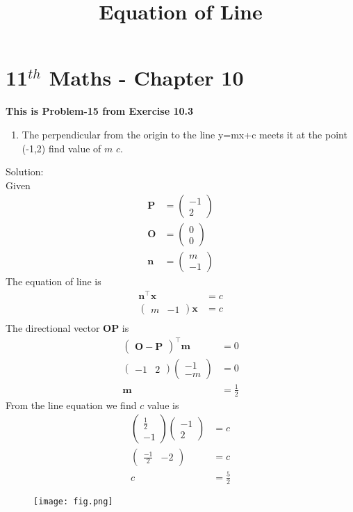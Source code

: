 \documentclass[journel,12pt,twocolumn]{article}
\newcommand{\myvec}[1]{\ensuremath{\begin{pmatrix}#1\end{pmatrix}}}
\let\vec\mathbf
\begin{document}
\begin{center}
\title{\textbf{Equation of Line}}
\date{\vspace{-5ex}} %
\maketitle
\end{center}
\section{11$^{th}$ Maths - Chapter 10}
\textbf{This is Problem-15 from Exercise 10.3}
\begin{enumerate}
\item The perpendicular from the origin to the line y=mx+c meets it at the point (-1,2) find value of $m$ $c$.
\end{enumerate}
Solution:
\\
Given
\begin{align}
\vec{P}&=\myvec{-1\\2}\\
\vec{O}&=\myvec{0\\0}\\
\vec{n}&=\myvec{m\\-1}
\end{align}
The equation of line is
\begin{align}
\vec{n}^{\top}\vec{x}&=c\\
\myvec{m&-1}\vec{x}&=c\\
\end{align}
The directional vector $\vec{OP}$ is 
\begin{align}
\myvec{\vec{O}-\vec{P}}^{\top}\vec{m}&=0\\
\myvec{-1&2}\myvec{-1\\-m}&=0\\
\vec{m}&=\frac{1}{2}
\end{align}
From the line equation we find $c$ value is
\begin{align}
\myvec{\frac{1}{2}\\-1}\myvec{-1\\2}&=c\\
\myvec{\frac{-1}{2}&-2}&=c\\
c&=\frac{5}{2}
\end{align}
\begin{figure}[!h]
\centering
\texttt{[image: fig.png]}
\caption{}
  \label{fig:Figure}
\end{figure}
\end{document}
